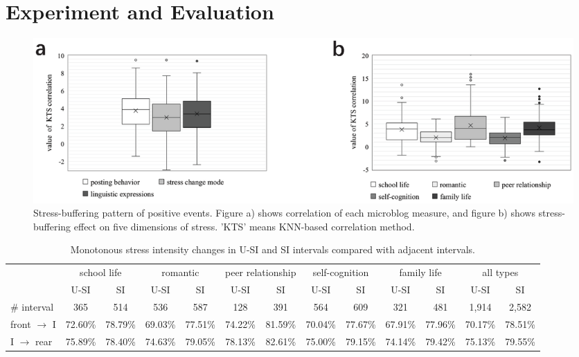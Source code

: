 
\section{Experiment and Evaluation}
\label{sec:experiment}
\begin{figure}
\centering
\includegraphics[width=0.9\linewidth]{figs/BOX3.eps}%
\caption{Stress-buffering pattern of positive events. Figure a) shows correlation of each microblog measure,
and figure b) shows stress-buffering effect on five dimensions of stress. 'KTS' means KNN-based correlation method.}
\label{fig:correlation}
\end{figure}

\begin{table}
\begin{center}
\caption{\small{Monotonous stress intensity changes in U-SI and SI intervals compared with adjacent intervals.}}
\small{
\begin{tabular}{l cccccc cccccc} \\\hline\hline
\multirow{2}{1cm}{}
&\multicolumn{2}{c}{school life}
&\multicolumn{2}{c}{romantic}
&\multicolumn{2}{c}{peer relationship}
&\multicolumn{2}{c}{self-cognition}
&\multicolumn{2}{c}{family life}
&\multicolumn{2}{c}{all types}\\
&U-SI	    &	SI	        &U-SI	    &SI	        &U-SI	   &SI	
&U-SI	    &	SI	        &	U-SI	&SI	        &U-SI	   &SI\\  \hline
\# interval         &   365	        &	514	        &	536	        &	587	        &128	    &	391	        &	564	           &	609	            &	321	        &	481	        &	1,914	    &2,582	 \\
front $\rightarrow$ I &	72.60\% &	78.79\% &	69.03\% 	&77.51\%   &74.22\%    &81.59\%    &70.04\%    &77.67\%  &67.91\%     &77.96\%    &70.17\%    &78.51\% \\
I $\rightarrow$ rear  &	75.89\% &	78.40\% &	74.63\% 	&79.05\%   &78.13\%    &82.61\%    &75.00\%    &79.15\%   &74.14\%    &79.42\%    &75.13\%    & 79.55\%\\ \hline \hline
\end{tabular}}%
\label{tab:fontrear}
\end{center}
\end{table}


